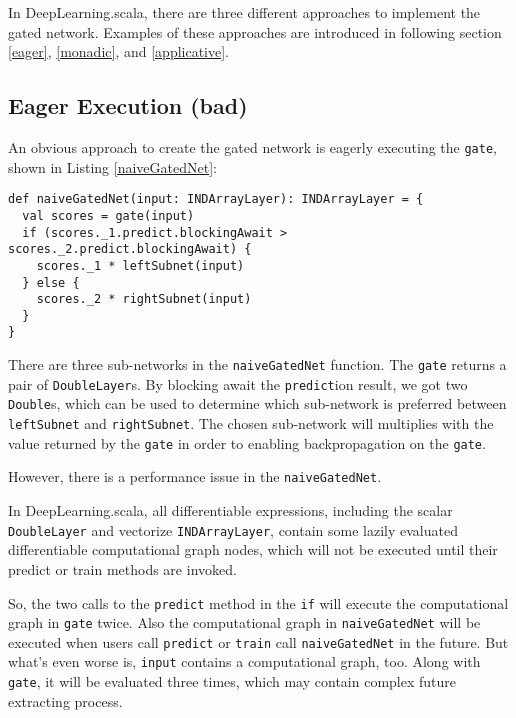 In DeepLearning.scala, there are three different approaches to implement the gated network. Examples of these approaches are introduced in following section \ref{eager}, \ref{monadic}, and \ref{applicative}.

\subsection{Eager Execution (bad)\label{eager}}

An obvious approach to create the gated network is eagerly executing the \lstinline{gate}, shown in Listing \ref{naiveGatedNet}:

\begin{lstlisting}[float={htbp},caption={The eager execution implementation of gated network}, label={naiveGatedNet}]
def naiveGatedNet(input: INDArrayLayer): INDArrayLayer = {
  val scores = gate(input)
  if (scores._1.predict.blockingAwait > scores._2.predict.blockingAwait) {
    scores._1 * leftSubnet(input)
  } else {
    scores._2 * rightSubnet(input)
  }
}
\end{lstlisting}

There are three sub-networks in the \lstinline{naiveGatedNet} function. The \lstinline{gate} returns a pair of \lstinline{DoubleLayer}s. By blocking await the \lstinline{predict}ion result, we got two \lstinline{Double}s, which can be used to determine which sub-network is preferred between \lstinline{leftSubnet} and \lstinline{rightSubnet}. The chosen sub-network will multiplies with the value returned by the \lstinline{gate} in order to enabling backpropagation on the \lstinline{gate}.

However, there is a performance issue in the \lstinline{naiveGatedNet}.

In DeepLearning.scala, all differentiable expressions, including the scalar \lstinline{DoubleLayer} and vectorize \lstinline{INDArrayLayer}, contain some lazily evaluated differentiable \gls{computational graph} nodes, which will not be executed until their predict or train methods are invoked.

So, the two calls to the \lstinline{predict} method in the \lstinline{if} will execute the \gls{computational graph} in \lstinline{gate} twice. Also the \gls{computational graph} in \lstinline{naiveGatedNet} will be executed when users call \lstinline{predict} or \lstinline{train} call \lstinline{naiveGatedNet} in the future. But what's even worse is, \lstinline{input} contains a \gls{computational graph}, too. Along with \lstinline{gate}, it will be evaluated three times, which may contain complex future extracting process.

